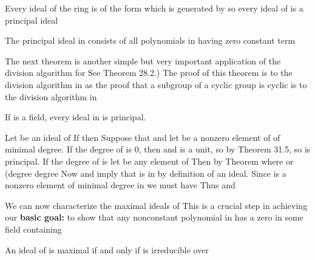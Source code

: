 \documentclass[11pt,oneside]{article}
\begin{document}
\begin{BookBody}
 Every ideal of the ring  is of the form  which is generated by  so every ideal of  is a principal ideal\BookEnd{\blacktriangle}

 The principal ideal  in  consists of all polynomials in  having zero constant term\BookEnd{\blacktriangle}

The next theorem is another simple but very important application of the division algorithm for See Theorem 28.2.) The proof of this theorem is to the division algorithm in  as the proof that a subgroup of a cyclic group is cyclic is to the division algorithm in 

 If  is a field, every ideal in  is principal.

 Let  be an ideal of  If  then  Suppose that  and let  be a nonzero element of  of minimal degree. If the degree of  is 0, then  and is a unit, so  by Theorem 31.5, so  is principal. If the degree of  is  let  be any element of  Then by Theorem  where  or (degree degree  Now  and  imply that  is in  by definition of an ideal. Since  is a nonzero element of minimal degree in  we must have  Thus  and  \BookEnd{\blacklozenge}

We can now characterize the maximal ideals of  This is a crucial step in achieving our\textbf{ basic goal:} to show that any nonconstant polynomial  in  has a zero in some field  containing 

 An ideal  of  is maximal if and only if  is irreducible over 

\end{BookBody}
\end{document}
